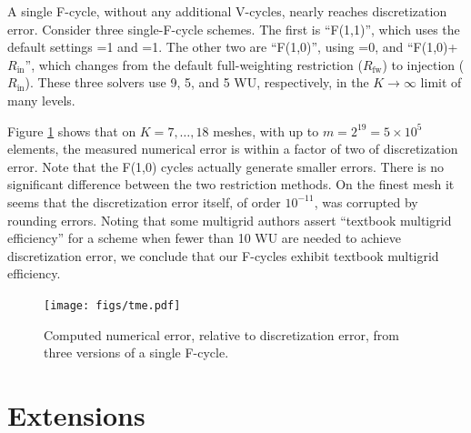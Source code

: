 \documentclass[letterpaper,final,12pt,reqno]{amsart}
\newcommand{\Rin}{R_{\text{in}}}
\newcommand{\Rfw}{R_{\text{fw}}}
\begin{document}
A single F-cycle, without any additional V-cycles, nearly reaches discretization error.  Consider three single-F-cycle schemes.  The first is ``F(1,1)'', which uses the default settings =1 and =1.  The other two are ``F(1,0)'', using =0, and ``F(1,0)+$\Rin$'', which changes from the default full-weighting restriction ($\Rfw$) to injection ($\Rin$).  These three solvers use 9, 5, and 5 WU, respectively, in the $K\to\infty$ limit of many levels.

Figure \ref{fig:tme} shows that on $K=7,\dots,18$ meshes, with up to $m=2^{19} = 5 \times 10^5$ elements, the measured numerical error is within a factor of two of discretization error.  Note that the F(1,0) cycles actually generate smaller errors.  There is no significant difference between the two restriction methods.  On the finest mesh it seems that the discretization error itself, of order $10^{-11}$, was corrupted by rounding errors.  Noting that some multigrid authors \cite[for example]{BrownSmithAhmadia2013} assert ``textbook multigrid efficiency'' for a scheme when fewer than 10 WU are needed to achieve discretization error, we conclude that our F-cycles exhibit textbook multigrid efficiency.

\begin{figure}
\texttt{[image: figs/tme.pdf]}
\caption{Computed numerical error, relative to discretization error, from three versions of a single F-cycle.}
\label{fig:tme}
\end{figure}


\section{Extensions}  \label{sec:extensions}
\end{document}
